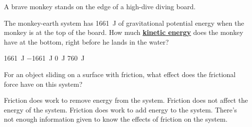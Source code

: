 \documentclass[]{exam}
\begin{document}
\begin{questions}



\question
A brave monkey stands on the edge of a high-dive diving board.

\begin{center}
\end{center}

The monkey-earth system has \SI{1661}{J} of gravitational potential energy when the monkey is at the top of the board. How much \textbf{\underline{kinetic energy}} does the monkey have at the bottom, right before he lands in the water?

\begin{randomizechoices}[norandomize]
    \correctchoice \SI{1661}{J}
    \choice \SI{-1661}{J}
    \choice \SI{0}{J}
    \choice \SI{760}{J}
\end{randomizechoices}



\question 
For an object sliding on a surface with friction, what effect does the frictional force have on this system?

\begin{randomizechoices}[norandomize]
    \correctchoice Friction does work to remove energy from the system.
    \choice Friction does not affect the energy of the system.
    \choice Friction does work to add energy to the system.
    \choice There's not enough information given to know the effects of friction on the system.
\end{randomizechoices}


\end{questions}
\end{document}
